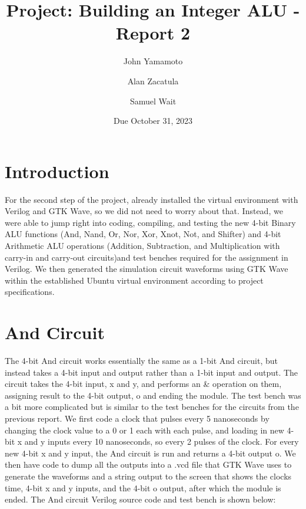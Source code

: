 \documentclass[runningheads, 12pt]{report}
\begin{document}
	
	\title{Project: Building an Integer ALU - Report 2}
	\author{John Yamamoto 
		\and Alan Zacatula
		\and  Samuel Wait}
	\date{Due October 31, 2023}

	\maketitle
	
	\section{Introduction}
	
	For the second step of the project, already installed the virtual environment with Verilog and GTK Wave, so we did not need to worry about that. Instead, we were able to jump right into coding, compiling, and testing the new 4-bit Binary ALU functions (And, Nand, Or, Nor, Xor, Xnot, Not, and Shifter) and 4-bit Arithmetic  ALU operations (Addition, Subtraction, and Multiplication with carry-in and carry-out circuits)and test benches required for the assignment in Verilog. We then generated the simulation circuit waveforms using GTK Wave within the established Ubuntu virtual environment according to project specifications.   
	
	\section{And Circuit}
	
	The 4-bit And circuit works essentially the same as a 1-bit And circuit, but instead takes a 4-bit input and output rather than a 1-bit input and output. The circuit takes the 4-bit input, x and y, and performs an & operation on them, assigning result to the 4-bit output, o and ending the module. The test bench was a bit more complicated but is similar to the test benches for the circuits from the previous report. We first code a clock that pulses every 5 nanoseconds by changing the clock value to a 0 or 1 each with each pulse, and loading in new 4-bit x and y inputs every 10 nanoseconds, so every 2 pulses of the clock. For every new 4-bit x and y input, the And circuit is run and returns a 4-bit output o. We then have code to dump all the outputs into a .vcd file that GTK Wave uses to generate the waveforms and a string output to the screen that shows the clocks time, 4-bit x and y inputs, and the 4-bit o output, after which the module is ended. The And circuit Verilog source code and test bench is shown below:
\end{document}
